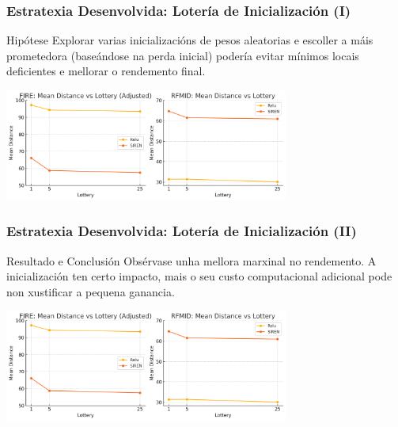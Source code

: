 \documentclass[xcolor=dvipsnames]{beamer}
\begin{document}
\begin{frame}
    \frametitle{Estratexia Desenvolvida: Lotería de Inicialización (I)}
    
    \begin{block}{Hipótese}
        Explorar varias inicializacións de pesos aleatorias e escoller a máis prometedora (baseándose na perda inicial) podería evitar mínimos locais deficientes e mellorar o rendemento final.
    \end{block}
    \vspace{0.5cm}

    \centering
    \includegraphics[width=0.7\textwidth]{../imaxes/lottery/lotery.png}
    
\end{frame}

\begin{frame}
    \frametitle{Estratexia Desenvolvida: Lotería de Inicialización (II)}
    \begin{alertblock}{Resultado e Conclusión}
        Obsérvase unha mellora marxinal no rendemento. A inicialización ten certo impacto, mais o seu custo computacional adicional pode non xustificar a pequena ganancia.
    \end{alertblock}
    \vspace{0.5cm}

    \centering
    \includegraphics[width=0.7\textwidth]{../imaxes/lottery/lotery.png}
    


\end{frame}
\end{document}
